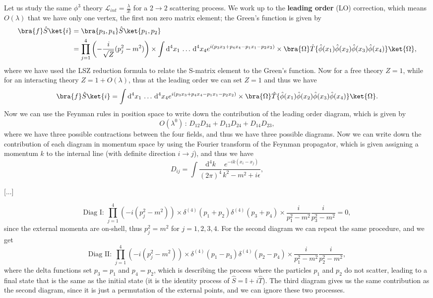 Let us study the same \(\phi^3\) theory \(\mathcal{L}_{int} = \frac{\lambda}{3!} \) for a \(2\to 2\) scattering process. We work up to the \textbf{leading order} (LO) correction, which means \(O(\lambda)\) that we have only one vertex, the first non zero matrix element; the Green's function is given by
\[
    \begin{aligned}
        \bra{f} \hat{S} \ket{i} & = \bra{p_3, p_4} \hat{S} \ket{p_1, p_2}                                                                                                                                                                                                                                                  \\
                                & = \prod_{j=1}^4 \left( -\frac{i}{\sqrt{Z}} (p_j^2 -m^2) \right) \times \int \mathrm{d}^4 x_1 \,\ldots\,\mathrm{d}^4 x_4 e^{i(p_3 x_3 + p_4 x_4 - p_1 x_1 - p_2 x_2)} \times \bra{\Omega} \hat{T} \{ \hat{\phi} (x_1) \hat{\phi} (x_2) \hat{\phi} (x_3) \hat{\phi} (x_4) \} \ket{\Omega},
    \end{aligned}
\]
where we have used the LSZ reduction formula to relate the S-matrix element to the Green's function. Now for a free theory \(Z=1\), while for an interacting theory \(Z = 1 + O(\lambda)\), thus at the leading order we can set \(Z=1\) and thus we have
\[
    \bra{f} \hat{S} \ket{i} = \int \mathrm{d}^4 x_1 \,\ldots\,\mathrm{d}^4 x_4 e^{i(p_3 x_3 + p_4 x_4 - p_1 x_1 - p_2 x_2)} \times \bra{\Omega} \hat{T} \{ \hat{\phi} (x_1) \hat{\phi} (x_2) \hat{\phi} (x_3) \hat{\phi} (x_4) \} \ket{\Omega}.
\]
Now we can use the Feynman rules in position space to write down the contribution of the leading order diagram, which is given by
\[
    O(\lambda^0) \, : \, D_{12} D_{34} + D_{13} D_{24} + D_{14} D_{23},
\]
where we have three possible contractions between the four fields, and thus we have three possible diagrams. Now we can write down the contribution of each diagram in momentum space by using the Fourier transform of the Feynman propagator, which is given assigning a momentum \(k\) to the internal line (with definite direction \(i \to j\)), and thus we have
\[
    D_{ij} = \int \frac{\mathrm{d}^4 k}{(2\pi)^4} \frac{e^{-i k (x_i - x_j)}}{k^2 - m^2 + i \epsilon},
\]

[...]

\[
    \text{Diag I: } \prod_{j=1}^4 \left( -i(p_j^2 -m^2) \right) \times \delta^{(4)}(p_1 + p_2) \delta^{(4)}(p_3 + p_4) \times \frac{i}{p_1^2 - m^2} \frac{i}{p_3^2 - m^2} = 0,
\]
since the external momenta are on-shell, thus \(p_j^2 = m^2\) for \(j=1,2,3,4\). For the second diagram we can repeat the same procedure, and we get
\[
    \text{Diag II: } \prod_{j=1}^4 \left( -i(p_j^2 -m^2) \right) \times \delta^{(4)}(p_1 - p_3) \delta^{(4)}(p_2 - p_4) \times \frac{i}{p_1^2 - m^2}\frac{i}{p_2^2 - m^2},
\]
where the delta functions set \(p_3 = p_1\) and \(p_4 = p_2\), which is describing the process where the particles \(p_1\) and \(p_2\) do not scatter, leading to a final state that is the same as the initial state (it is the identity process of \(\hat{S} = \mathbb{I} + i \hat{T}\)). The third diagram gives us the same contribution as the second diagram, since it is just a permutation of the external points, and we can ignore these two processes.

